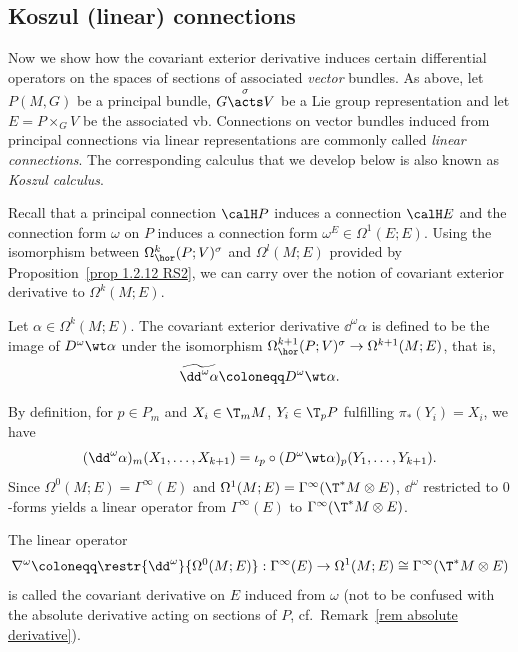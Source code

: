 \subsection{Koszul (linear) connections}\label{sec: koszul lin connections}

Now we show how the covariant exterior derivative induces certain differential operators on the spaces of sections of associated \emph{vector} bundles. As above, let $P(M,G)$ be a principal bundle, $G\overset{\sigma}{\acts}V$ be a Lie group representation and let $E=P\times_G V$ be the associated \gls{vb}. Connections on vector bundles induced from principal connections via linear representations are commonly called \emph{linear connections}. The corresponding calculus that we develop below is also known as \emph{Koszul calculus}.

Recall that a principal connection $\calH P$ induces a connection $\calH E$ and the connection form $\omega$ on $P$ induces a connection form $\omega^E\in \Omega^1(E;E)$. Using the isomorphism between $\Omega^k_{\hor}(P;V)^\sigma$ and $\Omega^l(M;E)$ provided by Proposition~\ref{prop 1.2.12 RS2}, we can carry over the notion of covariant exterior derivative to $\Omega^k(M;E)$.

\begin{defn}
    Let $\alpha\in\Omega^k(M;E)$. The covariant exterior derivative $\dd^\omega\alpha$ is defined to be the image of $D^\omega\wt\alpha$ under the isomorphism $\Omega^{k+1}_{\hor}(P;V)^\sigma\to \Omega^{k+1}(M;E)$, that is,
    \[\widetilde{\dd^\omega\alpha}\coloneqq D^\omega\wt\alpha.\]
\end{defn}

By definition, for $p\in P_m$ and $X_i\in \T_mM$, $Y_i\in \T_pP$ fulfilling $\pi_\ast(Y_i)=X_i$, we have
\[(\dd^\omega\alpha)_m(X_1,\ldots,X_{k+1})=\iota_p\circ(D^\omega\wt\alpha)_p(Y_1,\ldots,Y_{k+1}).\label{eq 1.5.2 RS2}\]
Since $\Omega^0(M;E)=\Gamma^\infty(E)$ and $\Omega^1(M;E)=\Gamma^\infty(\T^\ast M\otimes E)$, $\dd^\omega$ restricted to $0$-forms yields a linear operator from $\Gamma^\infty(E)$ to $\Gamma^\infty(\T^\ast M\otimes E)$.

\begin{defn}
    The linear operator
    \[\nabla^\omega\coloneqq \restr{\dd^\omega}{\Omega^0(M;E)}:\Gamma^\infty(E)\to \Omega^1(M;E)\cong\Gamma^\infty(\T^\ast M\otimes E)\]
    is called the covariant derivative on $E$ induced from $\omega$ (not to be confused with the absolute derivative acting on sections of $P$, cf.\ Remark~\ref{rem absolute derivative}). 
\end{defn}

